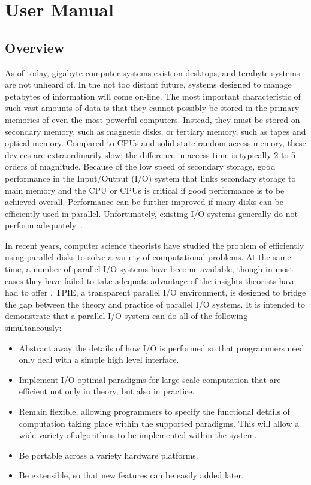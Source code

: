 \part{User Manual}

\chapter{Overview}

As of today, gigabyte computer systems exist on desktops, and terabyte
systems are not unheard of.  In the not too distant future, systems
designed to manage petabytes of information
will come on-line.  The most important characteristic of such vast
amounts of data is that they cannot possibly be stored in the primary
memories of even the most powerful computers.  Instead, they must be
stored on secondary memory, such as magnetic disks, or tertiary
memory, such as tapes and optical memory.  Compared to CPUs and solid
state random access memory, these devices are extraordinarily slow;
the difference in access time is typically 2 to 5 orders of magnitude.
Because of the low speed of secondary storage, good performance in the
Input/Output (I/O) system that links secondary storage to main memory
and the CPU or CPUs is critical if good performance is to be achieved
overall.  Performance can be further improved if many disks can be
efficiently used in parallel.  Unfortunately, existing I/O systems
generally do not perform adequately~\cite{patt:computer}.

In recent years, computer science theorists have studied the problem
of efficiently using parallel disks
 to solve a variety
of computational problems.  At the same time, a number of parallel I/O
systems have become available, though in most cases they have failed
to take adequate advantage of the insights theorists have had to offer
\cite{cormen:integrate-tr}.  TPIE, a transparent parallel I/O
environment, is designed to bridge the gap between the theory and
practice of parallel I/O systems.  It is intended to demonstrate that
a parallel I/O system can do all of the following simultaneously:
\begin{itemize}
\item Abstract away the details of how I/O is performed so that
  programmers need only deal with a simple high level interface.
\item Implement I/O-optimal paradigms for large scale computation that
  are efficient not only in theory, but also in practice.
\item Remain flexible, allowing programmers to specify the functional
  details of computation taking place within the supported paradigms.
  This will allow a wide variety of algorithms to be implemented
  within the system.
\item Be portable across a variety hardware platforms.
\item Be extensible, so that new features can be easily added later.
\end{itemize}

